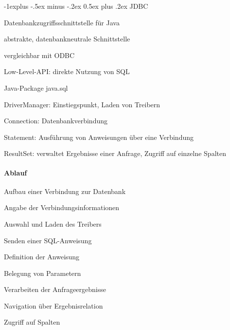 \documentclass[a4paper]{article}
\makeatletter
\renewcommand{\subsection}{\@startsection{subsection}{2}{0mm}%
                                {-1explus -.5ex minus -.2ex}%
                                {0.5ex plus .2ex}%
                                {\normalfont\normalsize\bfseries}}
\makeatother
\begin{document}
\begin{multicols}{3}
\subsection{JDBC}
\begin{itemize*}
    \item Datenbankzugriffsschnittstelle für Java
    \item abstrakte, datenbankneutrale Schnittstelle
    \item vergleichbar mit ODBC
    \item Low-Level-API: direkte Nutzung von SQL
    \item Java-Package java.sql
    \begin{itemize*}
        \item DriverManager: Einstiegspunkt, Laden von Treibern
        \item Connection: Datenbankverbindung
        \item Statement: Ausführung von Anweisungen über eine Verbindung
        \item ResultSet: verwaltet Ergebnisse einer Anfrage, Zugriff auf einzelne Spalten
    \end{itemize*}
\end{itemize*}



\paragraph{Ablauf}
\begin{enumerate*}
    \item Aufbau einer Verbindung zur Datenbank
    \begin{itemize*}
        \item Angabe der Verbindungsinformationen
        \item Auswahl und Laden des Treibers
    \end{itemize*}
    \item Senden einer SQL-Anweisung
    \begin{itemize*}
        \item Definition der Anweisung
        \item Belegung von Parametern
    \end{itemize*}
    \item Verarbeiten der Anfrageergebnisse
    \begin{itemize*}
        \item Navigation über Ergebnisrelation
        \item Zugriff auf Spalten
    \end{itemize*}
\end{enumerate*}


\end{multicols}
\end{document}
